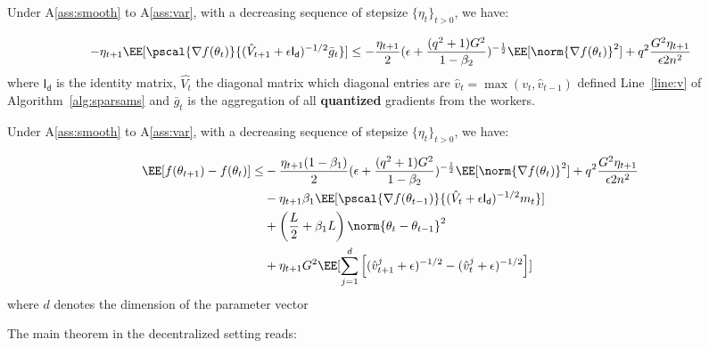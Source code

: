 \documentclass[11pt]{article}
\begin{document}
\begin{Lemma}\label{lem:lemma1}
Under A\ref{ass:smooth} to A\ref{ass:var}, with a decreasing sequence of stepsize $\{\eta_t\}_{t>0}$, we have:

\begin{equation}
-\eta_{t+1}\EE[\pscal{\nabla f(\theta_t)}{(\hat{V}_{t+1} + \epsilon \mathsf{I_d})^{-1/2} \bar{g}_t}] \leq - \frac{\eta_{t+1}}{2}  (\epsilon + \frac{(q^2+1)G^2}{1 - \beta_2})^{-\frac{1}{2}} \EE[\norm{\nabla f(\theta_t)}^2] +q^2 \frac{G^2 \eta_{t+1}}{\epsilon 2n^2}
\end{equation}
where $ \mathsf{I_d}$ is the identity matrix, $\hat{V_t}$ the diagonal matrix which diagonal entries are $\hat v_t=\max(v_t,\hat v_{t-1})$ defined Line~\ref{line:v} of Algorithm~\ref{alg:sparsams} and $\bar{g}_t$ is the aggregation of all \textbf{quantized} gradients from the workers.
\end{Lemma}

\begin{Lemma}\label{lem:lemma2}
Under A\ref{ass:smooth} to A\ref{ass:var}, with a decreasing sequence of stepsize $\{\eta_t\}_{t>0}$, we have:

\begin{equation}
\begin{split}
\EE[f(\theta_{t+1}) - f(\theta_{t}) ] \leq &   - \frac{\eta_{t+1}(1-\beta_1)}{2}  (\epsilon + \frac{(q^2+1)G^2}{1 - \beta_2})^{-\frac{1}{2}} \EE[\norm{\nabla f(\theta_t)}^2] +q^2 \frac{G^2 \eta_{t+1}}{\epsilon 2n^2} \\
&- \eta_{t+1} \beta_1\EE[\pscal{\nabla f(\theta_{t-1})}{(\hat{V}_{t} + \epsilon \mathsf{I_d})^{-1/2} m_{t}}]\\
& +  \left(\frac{L}{2} + \beta_1 L \right) \norm{\theta_t - \theta_{t-1}}^2\\
&+   \eta_{t+1} G^2 \EE[\sum_{j=1}^d \left[(\hat{v}^j_{t+1} + \epsilon )^{-1/2} - (\hat{v}^j_{t} + \epsilon )^{-1/2}  \right] ]
\end{split}
\end{equation}
where $d$ denotes the dimension of the parameter vector
\end{Lemma}




The main theorem in the decentralized setting reads:
\end{document}
